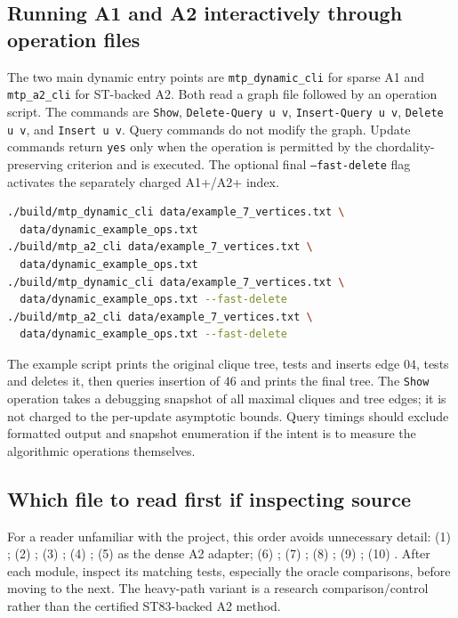 \subsection{Running A1 and A2 interactively through operation files}
The two main dynamic entry points are \texttt{mtp\_dynamic\_cli} for sparse A1 and \texttt{mtp\_a2\_cli} for ST-backed A2.  Both read a graph file followed by an operation script.  The commands are \texttt{Show}, \texttt{Delete-Query u v}, \texttt{Insert-Query u v}, \texttt{Delete u v}, and \texttt{Insert u v}.  Query commands do not modify the graph.  Update commands return \texttt{yes} only when the operation is permitted by the chordality-preserving criterion and is executed.  The optional final \texttt{--fast-delete} flag activates the separately charged A1+/A2+ index.
\begin{lstlisting}[language=bash]
./build/mtp_dynamic_cli data/example_7_vertices.txt \
  data/dynamic_example_ops.txt
./build/mtp_a2_cli data/example_7_vertices.txt \
  data/dynamic_example_ops.txt
./build/mtp_dynamic_cli data/example_7_vertices.txt \
  data/dynamic_example_ops.txt --fast-delete
./build/mtp_a2_cli data/example_7_vertices.txt \
  data/dynamic_example_ops.txt --fast-delete
\end{lstlisting}
The example script prints the original clique tree, tests and inserts edge \(04\), tests and deletes it, then queries insertion of \(46\) and prints the final tree.  The \texttt{Show} operation takes a debugging snapshot of all maximal cliques and tree edges; it is not charged to the per-update asymptotic bounds.  Query timings should exclude formatted output and snapshot enumeration if the intent is to measure the algorithmic operations themselves.

\subsection{Which file to read first if inspecting source}
For a reader unfamiliar with the project, this order avoids unnecessary detail: (1) ; (2) ; (3) ; (4) ; (5)  as the dense A2 adapter; (6) ; (7) ; (8) ; (9) ; (10) .  After each module, inspect its matching tests, especially the oracle comparisons, before moving to the next.  The  heavy-path variant is a research comparison/control rather than the certified ST83-backed A2 method.

